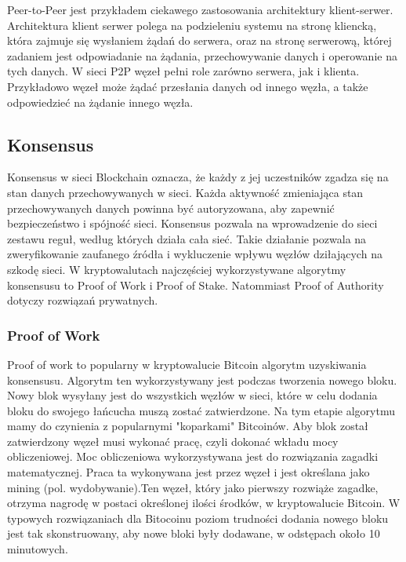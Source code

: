 \documentclass[a4paper,12pt]{book}
\begin{document}
Peer-to-Peer jest przykładem ciekawego zastosowania architektury klient-serwer. Architektura klient serwer polega na podzieleniu systemu na stronę kliencką, która zajmuje się wysłaniem żądań do serwera, oraz na stronę serwerową, której zadaniem jest odpowiadanie na żądania, przechowywanie danych i operowanie na tych danych. W sieci P2P węzeł pełni role zarówno serwera, jak i klienta. Przykładowo węzeł może żądać przesłania danych od innego węzła, a także odpowiedzieć na żądanie innego węzła.

\subsection{Konsensus}

Konsensus w sieci Blockchain oznacza, że każdy z jej uczestników zgadza się na stan danych przechowywanych w sieci. Każda aktywność zmieniająca stan przechowywanych danych powinna być autoryzowana, aby zapewnić bezpieczeństwo i spójność sieci. Konsensus pozwala na wprowadzenie do sieci zestawu reguł, według których działa cała sieć. Takie działanie pozwala na zweryfikowanie zaufanego źródła i wykluczenie wpływu węzłów dziłających na szkodę sieci. W kryptowalutach najczęściej wykorzystywane algorytmy konsensusu to Proof of Work i Proof of Stake. Natommiast Proof of Authority dotyczy rozwiązań prywatnych.

\subsubsection{Proof of Work}

Proof of work to popularny w kryptowalucie Bitcoin algorytm uzyskiwania konsensusu. Algorytm ten wykorzystywany jest podczas tworzenia nowego bloku. Nowy blok wysyłany jest do wszystkich węzłów w sieci, które w celu dodania bloku do swojego łańcucha muszą zostać zatwierdzone. Na tym etapie algorytmu mamy do czynienia z popularnymi "koparkami" Bitcoinów. Aby blok został zatwierdzony węzeł musi wykonać pracę, czyli dokonać wkładu mocy obliczeniowej. Moc obliczeniowa wykorzystywana jest do rozwiązania zagadki matematycznej. Praca ta wykonywana jest przez węzeł i jest określana jako mining (pol. wydobywanie).Ten węzeł, który jako pierwszy rozwiąże zagadke, otrzyma nagrodę w postaci określonej ilości środków, w kryptowalucie Bitcoin. W typowych rozwiązaniach dla Bitocoinu poziom trudności dodania nowego bloku jest tak skonstruowany, aby nowe bloki były dodawane, w odstępach około 10 minutowych\cite{pow-bitcoin}.
\end{document}
